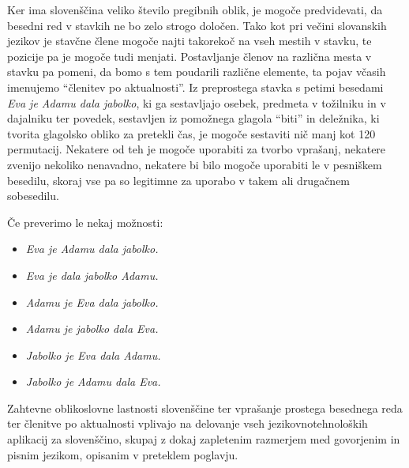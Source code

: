 \begin{multicols}{2}
Ker ima slovenščina veliko število pregibnih oblik, je mogoče predvidevati, da besedni red v stavkih ne bo zelo strogo določen. Tako kot pri večini slovanskih jezikov je stavčne člene mogoče najti takorekoč na vseh mestih v stavku, te pozicije pa je mogoče tudi menjati. Postavljanje členov na različna mesta v stavku pa pomeni, da bomo s tem poudarili različne elemente, ta pojav včasih imenujemo “členitev po aktualnosti”. Iz preprostega stavka s petimi besedami \textit{Eva je Adamu dala jabolko}, ki ga sestavljajo osebek, predmeta v tožilniku in v dajalniku ter povedek, sestavljen iz pomožnega glagola “biti” in deležnika, ki tvorita glagolsko obliko za pretekli čas, je mogoče sestaviti nič manj kot 120 permutacij. Nekatere od teh je mogoče uporabiti za tvorbo vprašanj, nekatere zvenijo nekoliko nenavadno, nekatere bi bilo mogoče uporabiti le v pesniškem besedilu, skoraj vse pa so legitimne za uporabo v takem ali drugačnem sobesedilu. 


Če preverimo le nekaj možnosti:

\begin{itemize}
\item \textit{Eva je Adamu dala jabolko.} 
\item \textit{Eva je dala jabolko Adamu.} 
\item \textit{Adamu je Eva dala jabolko.} 
\item \textit{Adamu je jabolko dala Eva.} 
\item \textit{Jabolko je Eva dala Adamu.} 
\item \textit{Jabolko je Adamu dala Eva.} 
\end{itemize}  

Zahtevne oblikoslovne lastnosti slovenščine ter vprašanje prostega besednega reda ter členitve po aktualnosti vplivajo na delovanje vseh jezikovnotehnoloških aplikacij za slovenščino, skupaj z dokaj zapletenim razmerjem med govorjenim in pisnim jezikom, opisanim v preteklem poglavju.


\end{multicols}
